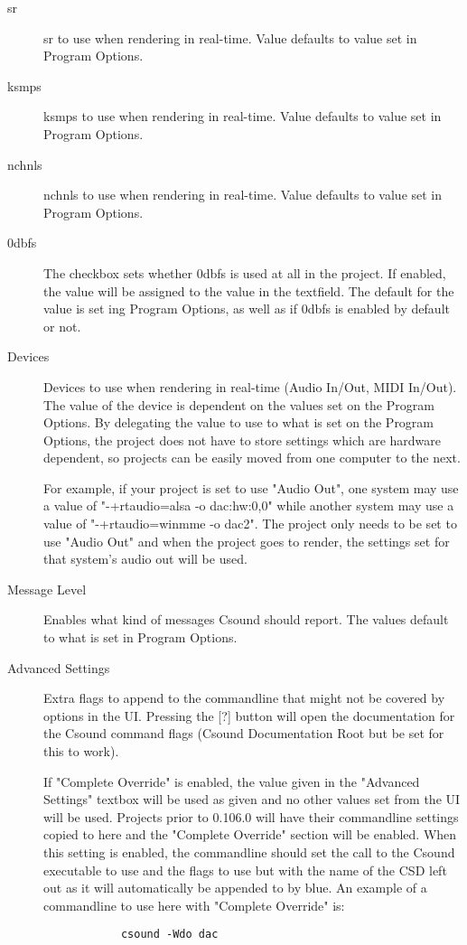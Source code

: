\begin{description}
\item[sr]
sr to use when rendering in real-time. Value defaults to value set in
Program Options.
\item[ksmps]
ksmps to use when rendering in real-time. Value defaults to value set in
Program Options.
\item[nchnls]
nchnls to use when rendering in real-time. Value defaults to value set
in Program Options.
\item[0dbfs]
The checkbox sets whether 0dbfs is used at all in the project. If
enabled, the value will be assigned to the value in the textfield. The
default for the value is set ing Program Options, as well as if 0dbfs is
enabled by default or not.
\item[Devices]
Devices to use when rendering in real-time (Audio In/Out, MIDI In/Out).
The value of the device is dependent on the values set on the Program
Options. By delegating the value to use to what is set on the Program
Options, the project does not have to store settings which are hardware
dependent, so projects can be easily moved from one computer to the
next.

For example, if your project is set to use "Audio Out", one system may
use a value of "-+rtaudio=alsa -o dac:hw:0,0" while another system may
use a value of "-+rtaudio=winmme -o dac2". The project only needs to be
set to use "Audio Out" and when the project goes to render, the settings
set for that system's audio out will be used.
\item[Message Level]
Enables what kind of messages Csound should report. The values default
to what is set in Program Options.
\item[Advanced Settings]
Extra flags to append to the commandline that might not be covered by
options in the UI. Pressing the {[}?{]} button will open the
documentation for the Csound command flags (Csound Documentation Root
but be set for this to work).

If "Complete Override" is enabled, the value given in the "Advanced
Settings" textbox will be used as given and no other values set from the
UI will be used. Projects prior to 0.106.0 will have their commandline
settings copied to here and the "Complete Override" section will be
enabled. When this setting is enabled, the commandline should set the
call to the Csound executable to use and the flags to use but with the
name of the CSD left out as it will automatically be appended to by
blue. An example of a commandline to use here with "Complete Override"
is:

\begin{verbatim}
            csound -Wdo dac
          
\end{verbatim}
\end{description}

